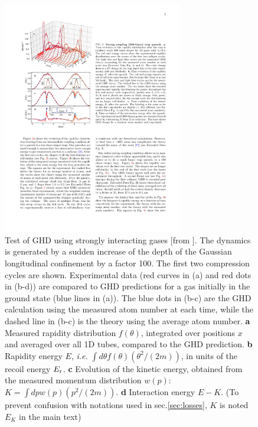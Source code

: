 \documentclass[onecolumn,amsfonts,showpacs,superscriptaddress]{revtex4-1}
\begin{document}
\begin{figure}
    \centering
    \includegraphics[viewport=43 339 313 762,clip,width=0.7\textwidth]{figures/GHDWeiss.pdf}
    \caption{Test of GHD using strongly interacting gases [from \citep{malvania2020generalized}]. The dynamics is generated by a sudden increase of the depth of the Gaussian longitudinal confinement by a factor 100. The first two compression cycles are shown. Experimental data (red curves in (a) and red dots in (b-d)) are compared to  GHD predictions for a gas initially in the ground state (blue lines in (a)). The blue dots in (b-c) are the GHD calculation using the measured atom number at each time, while the dashed line in (b-c) is the theory using the average atom number. {\bf a} Measured rapidity distribution $f(\theta)$, integrated over positions $x$ and averaged over all 1D tubes, compared to the GHD prediction. {\bf b} Rapidity energy $E$, {\it i.e.} $\int d\theta f(\theta) (\theta^2/(2m))$, in units of the recoil energy $E_{\rm r}$. {\bf c} Evolution of the kinetic energy, obtained from the measured momentum distribution $w(p)$: $K = \int dp w(p) (p^2/(2m))$. %
    {\bf d} Interaction energy $E-K$. (To prevent confusion with notations used in sec.\ref{sec:losses}, $K$ is noted $E_K$ in the main text)}%
    \label{fig:GHDWeiss}
\end{figure}
\end{document}
